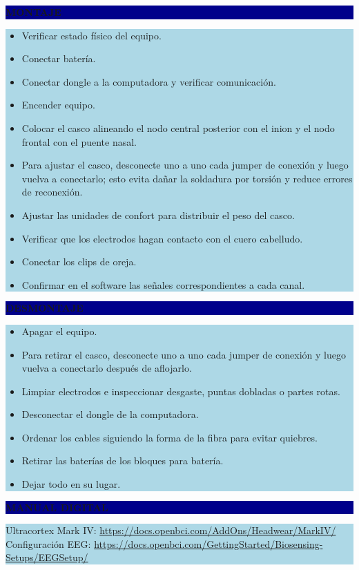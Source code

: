 \documentclass[11pt]{article}
\newcommand{\seccionbanda}[1]{%
  \vspace{0.6em}
  \noindent\colorbox{darkblue}{\parbox{\dimexpr\linewidth-2\fboxsep}{%
    \centering\color{white}\bfseries #1}}\par\vspace{0.6em}
}
\begin{document}
\newpage
\seccionbanda{MONTAJE}
\noindent\colorbox{lightblue}{\parbox{\dimexpr\linewidth-2\fboxsep\relax}{%
\begin{itemize}[label=$\square$, itemsep=4pt]
\item Verificar estado físico del equipo.
\item Conectar batería.
\item Conectar dongle a la computadora y verificar comunicación.
\item Encender equipo.
\item Colocar el casco alineando el nodo central posterior con el inion y el nodo frontal con el puente nasal.
\item Para ajustar el casco, desconecte uno a uno cada jumper de conexión y luego vuelva a conectarlo; esto evita dañar la soldadura por torsión y reduce errores de reconexión.
\item Ajustar las unidades de confort para distribuir el peso del casco.
\item Verificar que los electrodos hagan contacto con el cuero cabelludo.
\item Conectar los clips de oreja.
\item Confirmar en el software las señales correspondientes a cada canal.
\end{itemize}
}}\par

\seccionbanda{DESMONTAJE}
\noindent\colorbox{lightblue}{\parbox{\dimexpr\linewidth-2\fboxsep\relax}{%
\begin{itemize}[label=$\square$, itemsep=4pt]
\item Apagar el equipo.
\item Para retirar el casco, desconecte uno a uno cada jumper de conexión y luego vuelva a conectarlo después de aflojarlo.
\item Limpiar electrodos e inspeccionar desgaste, puntas dobladas o partes rotas.
\item Desconectar el dongle de la computadora.
\item Ordenar los cables siguiendo la forma de la fibra para evitar quiebres.
\item Retirar las baterías de los bloques para batería.
\item Dejar todo en su lugar.
\end{itemize}
}}\par

\seccionbanda{MANUAL DIGITAL}
\noindent\colorbox{lightblue}{\parbox{\dimexpr\linewidth-2\fboxsep\relax}{\vspace{0.5em}
Ultracortex Mark IV: \href{https://docs.openbci.com/AddOns/Headwear/MarkIV/}{https://docs.openbci.com/AddOns/Headwear/MarkIV/} \\
Configuración EEG: \href{https://docs.openbci.com/GettingStarted/Biosensing-Setups/EEGSetup/}{https://docs.openbci.com/GettingStarted/Biosensing-Setups/EEGSetup/} \\
\vspace{0.5em}}}\par
\end{document}
